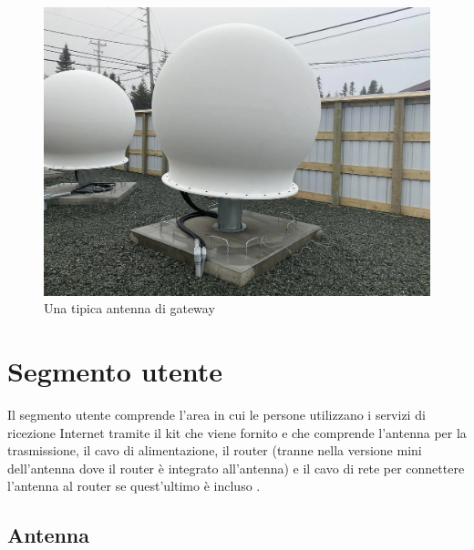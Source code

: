 \begin{figure}[htbp]
  \centering
  \includegraphics[width=0.9\linewidth]{./res/img/starlink_gateway_near.png}
  \caption{Una tipica antenna di gateway \cite{mike_puchol_modeling_2022}}
  \label{fig:starlink-gateway-near}
\end{figure}

\section{Segmento utente}
Il segmento utente comprende l'area in cui le persone utilizzano i servizi di ricezione Internet tramite il kit che viene fornito e che comprende l'antenna per la trasmissione, il cavo di alimentazione, il router (tranne nella versione mini dell'antenna dove il router è integrato all'antenna) e il cavo di rete per connettere l'antenna al router se quest'ultimo è incluso \cite{branch_education_how_2022}.

\subsection{Antenna}

